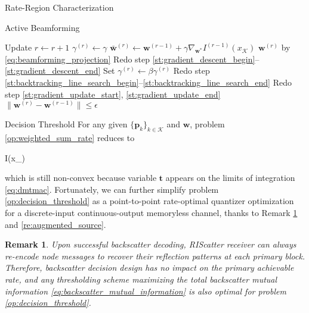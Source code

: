 \documentclass[journal]{IEEEtran}
\newtheorem{remark}{Remark}
\begin{document}
\begin{section}{Rate-Region Characterization}
\begin{subsection}{Active Beamforming}
\begin{algorithm}[!t]
\begin{algorithmic}[1]
				\Repeat
					\State Update $r \gets r+1$
					\State \phantom{Update} $\gamma^{(r)}\gets\gamma$
					\State \phantom{Update} $\bar{\boldsymbol{w}}^{(r)} \gets \boldsymbol{w}^{(r-1)}+\gamma\nabla_{\boldsymbol{w}^*} I^{(r-1)}(x_{\mathcal{K}})$ \label{st:backtracking_line_search_begin}
					\State \phantom{Update} $\boldsymbol{w}^{(r)}$ by \eqref{eq:beamforming_projection}
					\State Redo step \ref{st:gradient_descent_begin}--\ref{st:gradient_descent_end} \label{st:backtracking_line_search_end}
						\State Set $\gamma^{(r)}\gets\beta\gamma^{(r)}$
						\State Redo step \ref{st:backtracking_line_search_begin}--\ref{st:backtracking_line_search_end}
					\EndWhile
					\State Redo step \ref{st:gradient_update_start}, \ref{st:gradient_update_end}
				\Until $\lVert\boldsymbol{w}^{(r)}-\boldsymbol{w}^{(r-1)}\rVert \le \epsilon$
			\end{algorithmic}
		\end{algorithm}
	\end{subsection}

	\begin{subsection}{Decision Threshold}
		For any given $\{\boldsymbol{p}_k\}_{k \in \mathcal{K}}$ and $\boldsymbol{w}$, problem \eqref{op:weighted_sum_rate} reduces to
		\begin{maxi!}
			{}{I(x_{})}{\label{op:decision_threshold}}{\label{ob:decision_threshold}}
			\addConstraint{\eqref{co:sequential_threshold},\eqref{co:nonnegative_threshold},}
		\end{maxi!}
		which is still non-convex because variable $\boldsymbol{t}$ appears on the limits of integration \eqref{eq:dmtmac}.
		Fortunately, we can further simplify problem \eqref{op:decision_threshold} as a point-to-point rate-optimal quantizer optimization for a discrete-input continuous-output memoryless channel, thanks to Remark \ref{re:backscatter_decision} and \ref{re:augmented_source}.

		\begin{remark}
			Upon successful backscatter decoding, RIScatter receiver can always re-encode node messages to recover their reflection patterns at each primary block.
			Therefore, backscatter decision design has no impact on the primary achievable rate, and any thresholding scheme maximizing the total backscatter mutual information \eqref{eq:backscatter_mutual_information} is also optimal for problem \eqref{op:decision_threshold}.
			\label{re:backscatter_decision}
		\end{remark}


\end{subsection}
\end{section}
\end{document}
